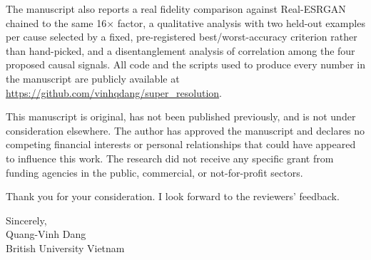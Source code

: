 \documentclass[11pt]{article}
\begin{document}
The manuscript also reports a real fidelity comparison against Real-ESRGAN chained to the same 16$\times$ factor, a qualitative analysis with two held-out examples per cause selected by a fixed, pre-registered best/worst-accuracy criterion rather than hand-picked, and a disentanglement analysis of correlation among the four proposed causal signals. All code and the scripts used to produce every number in the manuscript are publicly available at \url{https://github.com/vinhqdang/super_resolution}.

This manuscript is original, has not been published previously, and is not under consideration elsewhere. The author has approved the manuscript and declares no competing financial interests or personal relationships that could have appeared to influence this work. The research did not receive any specific grant from funding agencies in the public, commercial, or not-for-profit sectors.

Thank you for your consideration. I look forward to the reviewers' feedback.

\vspace{4pt}
Sincerely, \\
Quang-Vinh Dang \\
British University Vietnam
\end{document}
